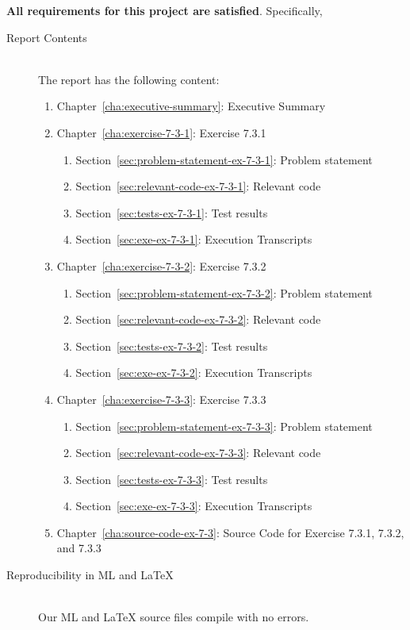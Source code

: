\documentclass{report}
\begin{document}
\textbf{All requirements for this project are satisfied}.
Specifically,
\begin{description}
\item[Report Contents] \ \\
  The report has the following content:
  \begin{enumerate}[{}]
  \item Chapter~\ref{cha:executive-summary}: Executive Summary
  \item Chapter~\ref{cha:exercise-7-3-1}: Exercise 7.3.1
    \begin{enumerate}[{}]
    \item Section~\ref{sec:problem-statement-ex-7-3-1}: Problem statement
    \item Section~\ref{sec:relevant-code-ex-7-3-1}: Relevant code
    \item Section~\ref{sec:tests-ex-7-3-1}: Test results
    \item Section~\ref{sec:exe-ex-7-3-1}: Execution Transcripts
    \end{enumerate}
  \item Chapter~\ref{cha:exercise-7-3-2}: Exercise 7.3.2
    \begin{enumerate}[{}]
    \item Section~\ref{sec:problem-statement-ex-7-3-2}: Problem statement
    \item Section~\ref{sec:relevant-code-ex-7-3-2}: Relevant code
    \item Section~\ref{sec:tests-ex-7-3-2}: Test results
    \item Section~\ref{sec:exe-ex-7-3-2}: Execution Transcripts
    \end{enumerate}
  \item Chapter~\ref{cha:exercise-7-3-3}: Exercise 7.3.3
    \begin{enumerate}[{}]
    \item Section~\ref{sec:problem-statement-ex-7-3-3}: Problem statement
    \item Section~\ref{sec:relevant-code-ex-7-3-3}: Relevant code
    \item Section~\ref{sec:tests-ex-7-3-3}: Test results
    \item Section~\ref{sec:exe-ex-7-3-3}: Execution Transcripts
    \end{enumerate}
  \item Chapter~\ref{cha:source-code-ex-7-3}: Source Code for Exercise
    7.3.1, 7.3.2, and 7.3.3
  \end{enumerate}
\item[Reproducibility in ML and \LaTeX{}] \ \\
  Our ML and \LaTeX{} source files compile with no errors.
\end{description}
\end{document}
